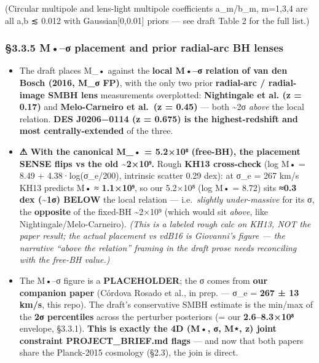\documentclass[
]{article}
\providecommand{\tightlist}{%
  \setlength{\itemsep}{0pt}\setlength{\parskip}{0pt}}
\begin{document}
(Circular multipole and lens-light multipole coefficients a\_m/b\_m,
m=1,3,4 are all \textbar a\textbar,\textbar b\textbar{} ≲ 0.012 with
Gaussian{[}0,0.01{]} priors --- see draft Table 2 for the full list.)

\hypertarget{mux3c3-placement-and-prior-radial-arc-bh-lenses}{%
\subsubsection{§3.3.5 M•--σ placement and prior radial-arc BH
lenses}\label{mux3c3-placement-and-prior-radial-arc-bh-lenses}}

\begin{itemize}
\tightlist
\item
  The draft places M\_• against the \textbf{local M•--σ relation of van
  den Bosch (2016, M\_σ FP)}, with the only two prior \textbf{radial-arc
  / radial-image SMBH lens} measurements overplotted:
  \textbf{Nightingale et al. (z = 0.17)} and \textbf{Melo-Carneiro et
  al.~(z = 0.45)} --- both \textasciitilde2σ \emph{above} the local
  relation. \textbf{DES J0206−0114 (z = 0.675) is the highest-redshift
  and most centrally-extended} of the three.
\item
  \textbf{⚠ With the canonical M\_• = 5.2×10⁸ (free-BH), the placement
  SENSE flips vs the old \textasciitilde2×10⁹.} Rough \textbf{KH13
  cross-check} (log M• = 8.49 + 4.38·log(σ\_e/200), intrinsic scatter
  0.29 dex): at σ\_e = 267 km/s KH13 predicts M• ≈ \textbf{1.1×10⁹}, so
  our 5.2×10⁸ (log M• = 8.72) sits \textbf{≈0.3 dex (\textasciitilde1σ)
  BELOW} the local relation --- i.e.~\emph{slightly under-massive} for
  its σ, the \textbf{opposite} of the fixed-BH \textasciitilde2×10⁹
  (which would sit \emph{above}, like Nightingale/Melo-Carneiro).
  \emph{(This is a labeled rough calc on KH13, NOT the paper result; the
  actual placement vs vdB16 is Giovanni's figure --- the narrative
  ``above the relation'' framing in the draft prose needs reconciling
  with the free-BH value.)}
\item
  The M•--σ figure is a \textbf{PLACEHOLDER}; the σ comes from
  \textbf{our companion paper} (Córdova Rosado et al., in prep. --- σ\_e
  = \textbf{267 ± 13 km/s}, this repo). The draft's conservative SMBH
  estimate is the min/max of the \textbf{2σ percentiles} across the
  perturber posteriors (= our \textbf{2.6--8.3×10⁸} envelope, §3.3.1).
  \textbf{This is exactly the 4D (M•, σ, M⋆, z) joint constraint
  PROJECT\_BRIEF.md flags} --- and now that both papers share the
  Planck-2015 cosmology (§2.3), the join is direct.
\end{itemize}
\end{document}
